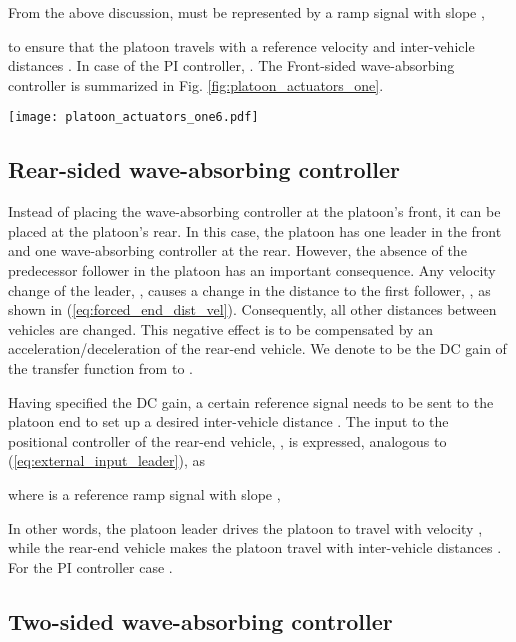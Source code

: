 \documentclass[final,5p,times,twocolumn]{elsarticle}
\begin{document}
From the above discussion,  must be represented by a ramp signal with slope ,

to ensure that the platoon travels with a reference velocity  and inter-vehicle distances . In case of the PI controller, . The Front-sided wave-absorbing controller is summarized in Fig. \ref{fig:platoon_actuators_one}.

\begin{figure*}[htb]\centering
\texttt{[image: platoon\_actuators\_one6.pdf]}
  \caption{Scheme of the Front-sided wave-absorbing vehicular platoon controller.}
  \label{fig:platoon_actuators_one}
\end{figure*}

\subsection{Rear-sided wave-absorbing controller}
\label{sec:rear_sided_WBC}

Instead of placing the wave-absorbing controller at the platoon's front, it can be placed at the platoon's rear. In this case, the platoon has one leader in the front and one wave-absorbing controller at the rear. However, the absence of the predecessor follower in the platoon has an important consequence. Any velocity change of the leader, , causes a change in the distance to the first follower, , as shown in (\ref{eq:forced_end_dist_vel}). Consequently, all other distances between vehicles are changed. This negative effect is to be compensated by an acceleration/deceleration of the rear-end vehicle. We denote  to be the DC gain of the transfer function from  to .

Having specified the DC gain, a certain reference signal needs to be sent to the platoon end to set up a desired inter-vehicle distance . The input to the positional controller of the rear-end vehicle, , is expressed, analogous to (\ref{eq:external_input_leader}), as

where  is a reference ramp signal with slope ,

In other words, the platoon leader drives the platoon to travel with velocity , while the rear-end vehicle makes the platoon travel with inter-vehicle distances . For the PI controller case .

\subsection{Two-sided wave-absorbing controller}
\label{sec:two_sided_WBC}
\end{document}
